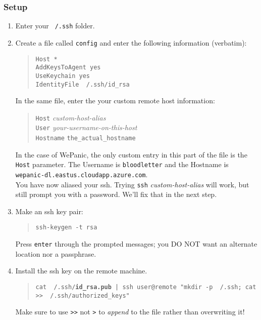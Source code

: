 \documentclass{article}
\begin{document}
\subsubsection*{Setup}
\begin{enumerate}
\item Enter your \texttt{~/.ssh} folder.
\item Create a file called \texttt{config} and enter the following information (verbatim):
    \begin{quote}
        \texttt{Host * \\
        AddKeysToAgent yes \\
        UseKeychain yes \\
        IdentityFile ~/.ssh/id\_rsa \\
        }
    \end{quote}
    In the same file, enter the your custom remote host information:
    \begin{quote}
        \texttt{Host} \textit{custom-host-alias} \\
        \texttt{User} \textit{your-username-on-this-host} \\ 
        \texttt{Hostname} \texttt{the\_actual\_hostname}
    \end{quote}
    In the case of WePanic, the only custom entry in this part of the file is the \texttt{Host} parameter. The
    Username is \texttt{bloodletter} and the Hostname is \texttt{wepanic-dl.eastus.cloudapp.azure.com}. \\
    You have now aliased your ssh. Trying \texttt{ssh} \textit{custom-host-alias} will work, but still prompt you
    with a password. We'll fix that in the next step.

\item Make an ssh key pair:
    \begin{quote}
        \texttt{ssh-keygen -t rsa}
    \end{quote}
    Press \texttt{enter} through the prompted messages; you DO NOT want an alternate location nor a passphrase.

\item Install the ssh key on the remote machine.
    \begin{quote}
        \texttt{cat ~/.ssh/\textbf{id\_rsa.pub} | ssh user@remote "mkdir -p ~/.ssh; cat >> ~/.ssh/authorized\_keys"}
    \end{quote}
        Make sure to use \texttt{>>} not \texttt{>} to \textit{append} to the file rather than overwriting it! 
\end{enumerate}
\end{document}

